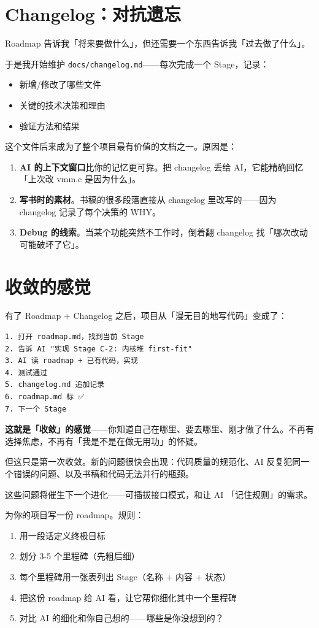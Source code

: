 \section{Changelog：对抗遗忘}

Roadmap 告诉我「将来要做什么」，但还需要一个东西告诉我「过去做了什么」。

于是我开始维护 \texttt{docs/changelog.md}——每次完成一个 Stage，记录：

\begin{itemize}
  \item 新增/修改了哪些文件
  \item 关键的技术决策和理由
  \item 验证方法和结果
\end{itemize}

这个文件后来成为了整个项目最有价值的文档之一。原因是：

\begin{enumerate}
  \item \textbf{AI 的上下文窗口}比你的记忆更可靠。把 changelog 丢给 AI，它能精确回忆「上次改 vmm.c 是因为什么」。
  \item \textbf{写书时的素材}。书稿的很多段落直接从 changelog 里改写的——因为 changelog 记录了每个决策的 WHY。
  \item \textbf{Debug 的线索}。当某个功能突然不工作时，倒着翻 changelog 找「哪次改动可能破坏了它」。
\end{enumerate}

\section{收敛的感觉}

有了 Roadmap + Changelog 之后，项目从「漫无目的地写代码」变成了：

\begin{lstlisting}[style=shellstyle]
1. 打开 roadmap.md，找到当前 Stage
2. 告诉 AI "实现 Stage C-2: 内核堆 first-fit"
3. AI 读 roadmap + 已有代码，实现
4. 测试通过
5. changelog.md 追加记录
6. roadmap.md 标 ✅
7. 下一个 Stage
\end{lstlisting}

\textbf{这就是「收敛」的感觉}——你知道自己在哪里、要去哪里、刚才做了什么。不再有选择焦虑，不再有「我是不是在做无用功」的怀疑。

但这只是第一次收敛。新的问题很快会出现：代码质量的规范化、AI 反复犯同一个错误的问题、以及书稿和代码无法并行的瓶颈。

这些问题将催生下一个进化——可插拔接口模式，和让 AI 「记住规则」的需求。

\begin{exercise}
为你的项目写一份 roadmap。规则：
\begin{enumerate}
  \item 用一段话定义终极目标
  \item 划分 3-5 个里程碑（先粗后细）
  \item 每个里程碑用一张表列出 Stage（名称 + 内容 + 状态）
  \item 把这份 roadmap 给 AI 看，让它帮你细化其中一个里程碑
  \item 对比 AI 的细化和你自己想的——哪些是你没想到的？
\end{enumerate}
\end{exercise}
